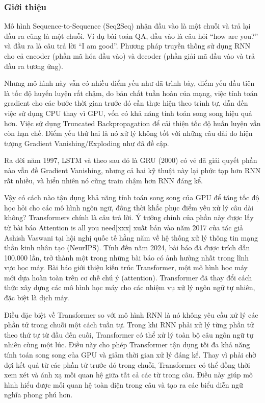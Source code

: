 \subsubsection{Giới thiệu}
Mô hình Sequence-to-Sequence (Seq2Seq) nhận đầu vào là một chuỗi và trả lại đầu ra cũng là một chuỗi. Ví dụ bài toán QA, đầu vào là câu hỏi ``how are you?'' và đầu ra là câu trả lời ``I am good''. Phương pháp truyền thống sử dụng RNN cho cả encoder (phần mã hóa đầu vào) và decoder (phần giải mã đầu vào và trả đầu ra tương ứng)\cite{webpage22}.

Nhưng mô hình này vẫn có nhiều điểm yếu như đã trình bày, điểm yếu đầu tiên là tốc độ huyến luyện rất chậm, do bản chất tuần hoàn của mạng, việc tính toán gradient cho các bước thời gian trước đó cần thực hiện theo trình tự, dẫn đến việc sử dụng CPU thay vì GPU, vốn có khả năng tính toán song song hiệu quả hơn. Việc sử dụng Truncated Backpropagation để cải thiện tốc độ huấn luyện vẫn còn hạn chế. Điểm yếu thứ hai là nó xử lý không tốt với những câu dài do hiện tượng Gradient Vanishing/Exploding như đã đề cập.

Ra đời năm 1997, LSTM và theo sau đó là GRU (2000) có vẻ đã giải quyết phần nào vẫn đề Gradient Vanishing, nhưng cả hai kỹ thuật này lại phức tạp hơn RNN rất nhiều, và hiển nhiên nó cũng train chậm hơn RNN đáng kể.

Vậy có cách nào tận dụng khả năng tính toán song song của GPU để tăng tốc độ học hỏi cho các mô hình ngôn ngữ, đồng thời khắc phục điểm yếu xử lý câu dài không? Transformers chính là câu trả lời. Ý tưởng chính của phần này được lấy từ bài báo Attention is all you need[xxx] xuất bản vào năm 2017 của tác giả Ashish Vaswani tại hội nghị quốc tế hằng năm về hệ thống xử lý thông tin mạng thần kinh nhân tạo (NeurIPS). Tính đến năm 2024, bài báo đã được trích dẫn 100.000 lần, trở thành một trong những bài báo có ảnh hưởng nhất trong lĩnh vực học máy. Bài báo giới thiệu kiến trúc Transformer, một mô hình học máy mới dựa hoàn toàn trên cơ chế chú ý (attention). Transformer đã thay đổi cách thức xây dựng các mô hình học máy cho các nhiệm vụ xử lý ngôn ngữ tự nhiên, đặc biệt là dịch máy.

Điều đặc biệt về Transformer so với mô hình RNN là nó không yêu cầu xử lý các phần tử trong chuỗi một cách tuần tự. Trong khi RNN phải xử lý từng phần tử theo thứ tự từ đầu đến cuối, Transformer có thể xử lý toàn bộ câu ngôn ngữ tự nhiên cùng một lúc. Điều này cho phép Transformer tận dụng tối đa khả năng tính toán song song của GPU và giảm thời gian xử lý đáng kể. Thay vì phải chờ đợi kết quả từ các phần tử trước đó trong chuỗi, Transformer có thể đồng thời xem xét và ánh xạ mối quan hệ giữa tất cả các từ trong câu. Điều này giúp mô hình hiểu được mối quan hệ toàn diện trong câu và tạo ra các biểu diễn ngữ nghĩa phong phú hơn.

